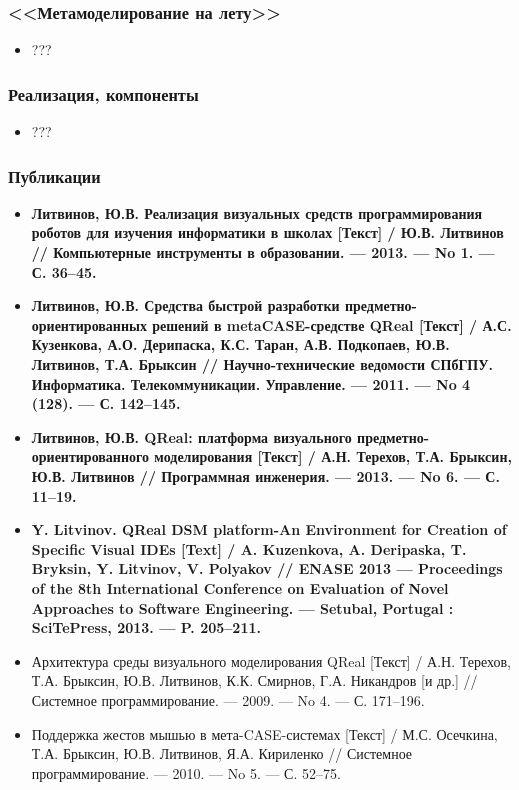 \documentclass[14pt]{beamer}
\begin{document}
\begin{frame}
    \frametitle{<<Метамоделирование на лету>>}
    \begin{itemize}
        \item ???
    \end{itemize}
\end{frame}

\begin{frame}
    \frametitle{Реализация, компоненты}
    \begin{itemize}
        \item ???
    \end{itemize}
\end{frame}

\begin{frame}
    \frametitle{Публикации}
    \begin{itemize}
        \scriptsize
        \item \textbf{Литвинов, Ю.В. Реализация визуальных средств программирования роботов
            для изучения информатики в школах [Текст] / Ю.В. Литвинов // Компьютерные
            инструменты в образовании. --- 2013. --- No 1. --- С. 36--45.}
        \item \textbf{Литвинов, Ю.В. Средства быстрой разработки предметно-ориентированных
            решений в metaCASE-средстве QReal [Текст] / А.С. Кузенкова, А.О. Дерипаска, 
            К.С. Таран, А.В. Подкопаев, Ю.В. Литвинов, Т.А. Брыксин 
            // Научно-технические ведомости СПбГПУ. Информатика. Телекоммуникации.
            Управление. --- 2011. --- No 4 (128). --- С. 142--145.}
        \item \textbf{Литвинов, Ю.В. QReal: платформа визуального предметно-ориентированного
            моделирования [Текст] / А.Н. Терехов, Т.А. Брыксин, Ю.В. Литвинов 
            // Программная инженерия. --- 2013. --- No 6. --- С. 11--19.}
        \item \textbf{Y. Litvinov. QReal DSM platform-An Environment for Creation of
            Specific Visual IDEs [Text] / A. Kuzenkova, A. Deripaska, T. Bryksin, 
            Y. Litvinov, V. Polyakov 
            // ENASE 2013 --- Proceedings of the 8th International Conference on 
            Evaluation of Novel Approaches to Software Engineering. --- Setubal, Portugal : 
            SciTePress, 2013. --- P. 205--211.}
        \item Архитектура среды визуального моделирования QReal [Текст] / А.Н. Терехов,
            Т.А. Брыксин, Ю.В. Литвинов, К.К. Смирнов, Г.А. Никандров [и др.] 
            // Системное программирование. --- 2009. --- No 4. --- С. 171--196.
        \item Поддержка жестов мышью в мета-CASE-системах [Текст] 
            / М.С. Осечкина, Т.А. Брыксин, Ю.В. Литвинов, Я.А. Кириленко 
            // Системное программирование. --- 2010. --- No 5. --- С. 52--75.
    \end{itemize}
\end{frame}
\end{document}
